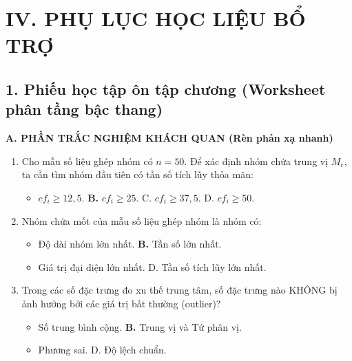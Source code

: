 \documentclass[12pt, a4paper]{article}
\begin{document}
\section*{IV. PHỤ LỤC HỌC LIỆU BỔ TRỢ}

\subsection*{1. Phiếu học tập ôn tập chương (Worksheet phân tầng bậc thang)}

\noindent \textbf{A. PHẦN TRẮC NGHIỆM KHÁCH QUAN (Rèn phản xạ nhanh)}
\begin{enumerate}[leftmargin=0.6cm]
    \item Cho mẫu số liệu ghép nhóm có $n = 50$. Để xác định nhóm chứa trung vị $M_e$, ta cần tìm nhóm đầu tiên có tần số tích lũy thỏa mãn:
    \begin{itemize}[leftmargin=0.6cm]
        \item[A.] $cf_i \ge 12{,}5$. \quad \textbf{B.} $cf_i \ge 25$. \quad C. $cf_i \ge 37{,}5$. \quad D. $cf_i \ge 50$.
    \end{itemize}
    \item Nhóm chứa mốt của mẫu số liệu ghép nhóm là nhóm có:
    \begin{itemize}[leftmargin=0.6cm]
        \item[A.] Độ dài nhóm lớn nhất. \quad \textbf{B.} Tần số lớn nhất.
        \item[C.] Giá trị đại diện lớn nhất. \quad D. Tần số tích lũy lớn nhất.
    \end{itemize}
    \item Trong các số đặc trưng đo xu thế trung tâm, số đặc trưng nào KHÔNG bị ảnh hưởng bởi các giá trị bất thường (outlier)?
    \begin{itemize}[leftmargin=0.6cm]
        \item[A.] Số trung bình cộng. \quad \textbf{B.} Trung vị và Tứ phân vị.
        \item[C.] Phương sai. \quad D. Độ lệch chuẩn.
    \end{itemize}
\end{enumerate}
\end{document}
